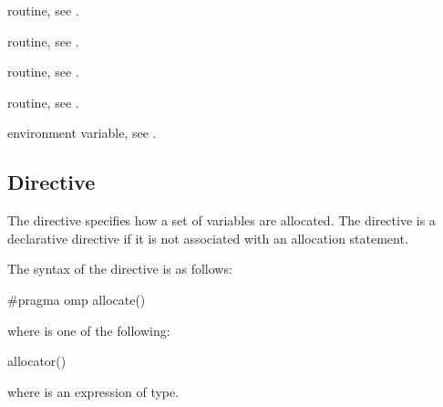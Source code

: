 \begin{crossrefs}
\item {} routine, see .

\item {} routine, see .

\item {} routine, 
see .

\item {} routine, 
see .

\item {} environment variable, see .
\end{crossrefs}



\subsection{ Directive}
\label{subsec:allocate Directive}
\summary

The  directive specifies how a set of variables are allocated. 
The  directive is a declarative directive if it is not associated 
with an allocation statement.

\syntax
\begin{ccppspecific}
The syntax of the  directive is as follows:

\begin{ompcPragma}
#pragma omp allocate() 
\end{ompcPragma}

where  is one of the following:

\begin{indentedcodelist}
allocator()
\end{indentedcodelist}

where  is an expression of  type.

\end{ccppspecific}
\medskip

